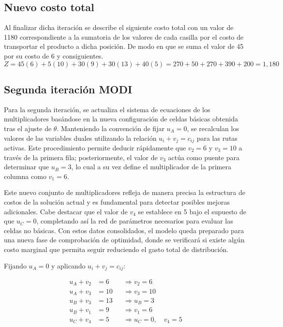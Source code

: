 \documentclass{article}
\begin{document}
	\subsection{Nuevo costo total}
	Al finalizar dicha iteración se describe el siguiente costo total con un valor de 1180 correspondiente a la sumatoria de los valores de cada casilla por el costo de transportar el producto a dicha posición. De modo en que se suma el valor de 45 por su costo de 6 y consiguientes. 
	\[
	Z = 45(6) + 5(10) + 30(9) + 30(13) + 40(5)
	= 270 + 50 + 270 + 390 + 200
	= \boxed{1{,}180}
	\]
	
	\subsection{Segunda iteración MODI}
	
	Para la segunda iteración, se actualiza el sistema de ecuaciones de los multiplicadores basándose en la nueva configuración de celdas básicas obtenida tras el ajuste de $\theta$. Manteniendo la convención de fijar $u_A = 0$, se recalculan los valores de las variables duales utilizando la relación $u_i + v_j = c_{ij}$ para las rutas activas. Este procedimiento permite deducir rápidamente que $v_2 = 6$ y $v_3 = 10$ a través de la primera fila; posteriormente, el valor de $v_3$ actúa como puente para determinar que $u_B = 3$, lo cual a su vez define el multiplicador de la primera columna como $v_1 = 6$.
	
	Este nuevo conjunto de multiplicadores refleja de manera precisa la estructura de costos de la solución actual y es fundamental para detectar posibles mejoras adicionales. Cabe destacar que el valor de $v_4$ se establece en 5 bajo el supuesto de que $u_C = 0$, completando así la red de parámetros necesarios para evaluar las celdas no básicas. Con estos datos consolidados, el modelo queda preparado para una nueva fase de comprobación de optimidad, donde se verificará si existe algún costo marginal que permita seguir reduciendo el gasto total de distribución.
	
	Fijando $u_A = 0$ y aplicando $u_i + v_j = c_{ij}$:
	
	\begin{align*}
		u_A + v_2 &= 6  &&\Longrightarrow v_2 = 6  \\
		u_A + v_3 &= 10 &&\Longrightarrow v_3 = 10 \\
		u_B + v_3 &= 13 &&\Longrightarrow u_B = 3  \\
		u_B + v_1 &= 9  &&\Longrightarrow v_1 = 6  \\
		u_C + v_4 &= 5  &&\Longrightarrow u_C = 0,\quad v_4 = 5
	\end{align*}
	
\end{document}
